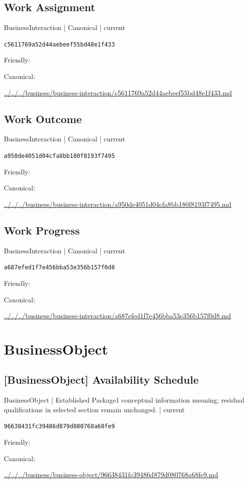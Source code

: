 \documentclass[10pt,a4paper]{article}
\begin{document}
\subsection*{Work Assignment}
{\small BusinessInteraction | Canonical | current}\par
\texttt{c5611769a52d44aebeef55bd48e1f433}\par
Friendly: \par
Canonical: \par
{\footnotesize\url{../../../business/business-interaction/c5611769a52d44aebeef55bd48e1f433.md}}\par
\subsection*{Work Outcome}
{\small BusinessInteraction | Canonical | current}\par
\texttt{a950de4051d04cfa8bb180f8193f7495}\par
Friendly: \par
Canonical: \par
{\footnotesize\url{../../../business/business-interaction/a950de4051d04cfa8bb180f8193f7495.md}}\par
\subsection*{Work Progress}
{\small BusinessInteraction | Canonical | current}\par
\texttt{a687efed1f7e456bba53e356b157f0d8}\par
Friendly: \par
Canonical: \par
{\footnotesize\url{../../../business/business-interaction/a687efed1f7e456bba53e356b157f0d8.md}}\par
\section*{BusinessObject}
\subsection*{[BusinessObject] Availability Schedule}
{\small BusinessObject | Established Package1 conceptual information meaning; residual qualifications in selected section remain unchanged. | current}\par
\texttt{96638431fc39486d879d080768a68fe9}\par
Friendly: \par
Canonical: \par
{\footnotesize\url{../../../business/business-object/96638431fc39486d879d080768a68fe9.md}}\par
\end{document}

